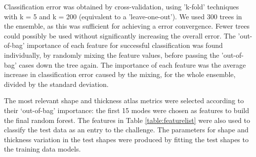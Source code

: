 \documentclass[journal]{IEEEtran}
\begin{document}
Classification error was obtained by cross-validation, using 'k-fold' techniques with k = 5 and k = 200 (equivalent to a 'leave-one-out'). We used 300 trees in the ensemble, as this was sufficient for achieving a error convergence. Fewer trees could possibly be used without significantly increasing the overall error. The 'out-of-bag' importance of each feature for successful classification was found individually, by randomly mixing the feature values, before passing the 'out-of-bag' cases down the tree again. The importance of each feature was the average increase in classification error caused by the mixing, for the whole ensemble, divided by the standard deviation.

The most relevant shape and thickness atlas metrics were selected according to their ‘out-of-bag’ importance: the first 15 modes were chosen as features to build the final random forest. The features in Table \ref{table:featurelist} were also used to classify the test data as an entry to the challenge. The parameters for shape and thickness variation in the test shapes were produced by fitting the test shapes to the training data models.
\end{document}
